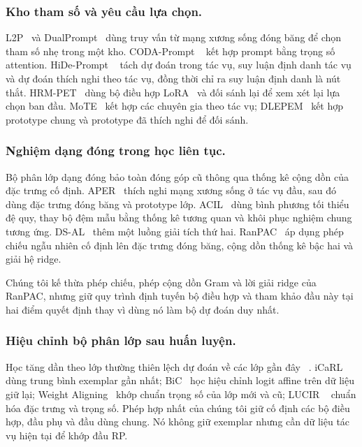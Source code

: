 \documentclass[runningheads]{llncs}
\begin{document}
\subsubsection{Kho tham số và yêu cầu lựa chọn.}
L2P~\cite{ref_l2p} và DualPrompt~\cite{ref_dualprompt} dùng truy vấn từ mạng
xương sống đóng băng để chọn tham số nhẹ trong một kho. CODA-Prompt
~\cite{ref_coda} kết hợp prompt bằng trọng số attention. HiDe-Prompt
~\cite{ref_hide} tách dự đoán trong tác vụ, suy luận định danh tác vụ và dự
đoán thích nghi theo tác vụ, đồng thời chỉ ra suy luận định danh là nút thắt.
HRM-PET~\cite{ref_hrmpet} dùng bộ điều hợp LoRA~\cite{ref_lora} và đối sánh lại
để xem xét lại lựa chọn ban đầu. MoTE~\cite{ref_mote} kết hợp các chuyên gia
theo tác vụ; DLEPEM~\cite{ref_dlepem} kết hợp prototype chung và prototype đã
thích nghi để đối sánh.

\subsubsection{Nghiệm dạng đóng trong học liên tục.}
Bộ phân lớp dạng đóng bảo toàn đóng góp cũ thông qua thống kê cộng dồn của đặc
trưng cố định. APER~\cite{ref_adam} thích nghi mạng xương sống ở tác vụ đầu,
sau đó dùng đặc trưng đóng băng và prototype lớp. ACIL~\cite{ref_acil} dùng
bình phương tối thiểu đệ quy, thay bộ đệm mẫu bằng thống kê tương quan và khôi
phục nghiệm chung tương ứng. DS-AL~\cite{ref_dsal} thêm một luồng giải tích thứ
hai. RanPAC~\cite{ref_ranpac} áp dụng phép chiếu ngẫu nhiên cố định lên đặc
trưng đóng băng, cộng dồn thống kê bậc hai và giải hệ ridge.

Chúng tôi kế thừa phép chiếu, phép cộng dồn Gram và lời giải ridge của RanPAC,
nhưng giữ quy trình định tuyến bộ điều hợp và tham khảo đầu này tại hai điểm
quyết định thay vì dùng nó làm bộ dự đoán duy nhất.

\subsubsection{Hiệu chỉnh bộ phân lớp sau huấn luyện.}
Học tăng dần theo lớp thường thiên lệch dự đoán về các lớp gần đây
~\cite{ref_survey}. iCaRL~\cite{ref_icarl} dùng trung bình exemplar gần nhất;
BiC~\cite{ref_bic} học hiệu chỉnh logit affine trên dữ liệu giữ lại; Weight
Aligning~\cite{ref_wa} khớp chuẩn trọng số của lớp mới và cũ; LUCIR
~\cite{ref_lucir} chuẩn hóa đặc trưng và trọng số. Phép hợp nhất của chúng tôi
giữ cố định các bộ điều hợp, đầu phụ và đầu dùng chung. Nó không giữ exemplar
nhưng cần dữ liệu tác vụ hiện tại để khớp đầu RP.
\end{document}
